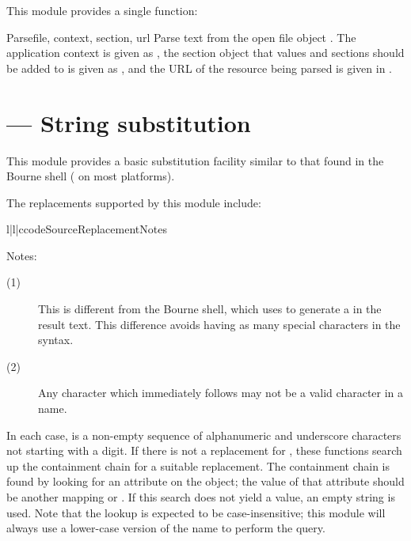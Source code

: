 \documentclass{howto}
\begin{document}
This module provides a single function:

\begin{funcdesc}{Parse}{file, context, section, url}
  Parse text from the open file object .  The application
  context is given as , the section object that values
  and sections should be added to is given as , and the
  URL of the resource being parsed is given in .
\end{funcdesc}


\section{ --- String substitution}


This module provides a basic substitution facility similar to that
found in the Bourne shell ( on most \UNIX{} platforms).  

The replacements supported by this module include:

\begin{tableiii}{l|l|c}{code}{Source}{Replacement}{Notes}
\end{tableiii}

\noindent
Notes:
\begin{description}
  \item[(1)]  This is different from the Bourne shell, which uses
              \code{\textbackslash\$} to generate a \character{\$} in
              the result text.  This difference avoids having as many
              special characters in the syntax.

  \item[(2)]  Any character which immediately follows  may
              not be a valid character in a name.
\end{description}

In each case,  is a non-empty sequence of alphanumeric and
underscore characters not starting with a digit.  If there is not a
replacement for , these functions search up the containment
chain for a suitable replacement.  The containment chain is found by
looking for an attribute  on the 
object; the value of that attribute should be another mapping or
.  If this search does not yield a value, an empty string
is used.
Note that the lookup is expected to be case-insensitive; this module
will always use a lower-case version of the name to perform the query.
\end{document}
